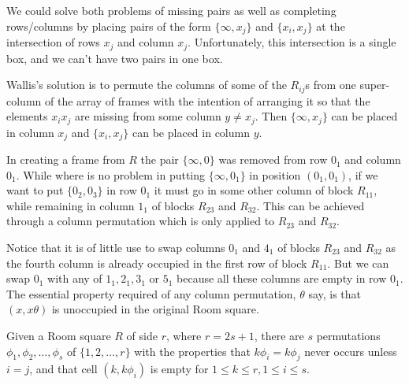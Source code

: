 We could solve both problems of missing pairs as well as completing rows/columns by placing pairs of the form $\{\infty, x_{j}\}$ and $\{x_{i}, x_{j}\}$ at the intersection of rows $x_{j}$ and column $x_{j}$.
Unfortunately, this intersection is a single box, and we can't have two pairs in one box.

Wallis's solution is to permute the columns of some of the $R_{ij}$s from one super-column of the array of frames with the intention of arranging it so that the elements $x_i x_j$ are missing from some column $y \neq x_j$.
Then $\{\infty, x_j\}$ can be placed in column $x_j$ and $\{x_i,x_j\}$ can be placed in column $y$.

In creating a frame from $R$ the pair $\{\infty, 0\}$ was removed from row $0_{1}$ and column $0_{1}$.
While where is no problem in putting $\{\infty, 0_{1}\}$ in position $(0_{1}, 0_{1})$, if we want to put $\{0_{2}, 0_{3}\}$ in row $0_{1}$ it must go in some other column of block $R_{11}$, while remaining in column $1_{1}$ of blocks $R_{23}$ and $R_{32}$.
This can be achieved through a column permutation which is only applied to $R_{23}$ and $R_{32}$.

Notice that it is of little use to swap columns $0_1$ and $4_1$ of blocks $R_{23}$ and $R_{32}$ as the fourth column is already occupied in the first row of block $R_{11}$.
But we can swap $0_1$ with any of $1_1, 2_1, 3_1$ or $5_1$ because all these columns are empty in row $0_1$.
The essential property required of any column permutation, $\theta$ say, is that $(x, x\theta)$ is unoccupied in the original Room square.

\begin{lemma}
\label{lem:permute}
Given a Room square $R$ of side $r$, where $r = 2s + 1$, there are $s$ permutations $\phi_1, \phi_2, \dots, \phi_s$ of $\{1, 2, \ldots, r\}$ with the properties that $k\phi_{i} = k\phi_{j}$ never occurs unless $i = j$, and that cell $(k, k\phi_{i})$ is empty for $1 \leq k \leq r, 1 \leq i\leq s$.
\end{lemma}

